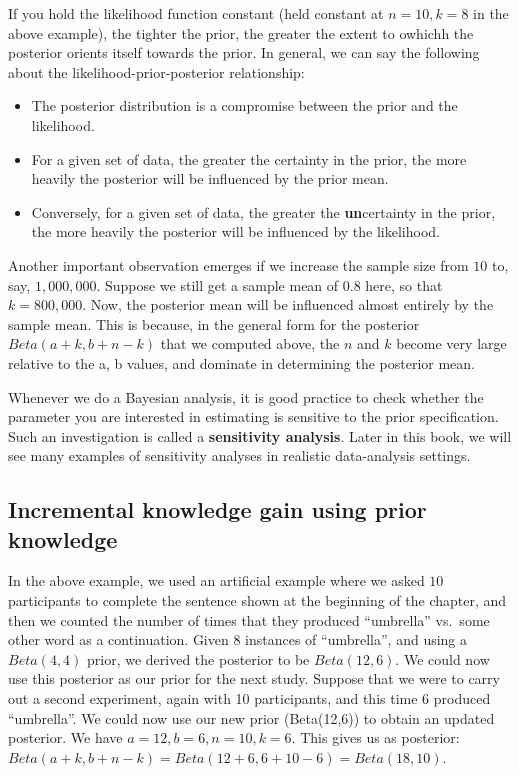 \documentclass[12pt,]{krantz}
\providecommand{\tightlist}{%
  \setlength{\itemsep}{0pt}\setlength{\parskip}{0pt}}
\theoremstyle{definition}
\theoremstyle{definition}
\theoremstyle{definition}
\theoremstyle{remark}
\begin{document}
If you hold the likelihood function constant (held constant at \(n=10, k=8\) in the above example), the tighter the prior, the greater the extent to owhichh the posterior orients itself towards the prior. In general, we can say the following about the likelihood-prior-posterior relationship:

\begin{itemize}
\tightlist
\item
  The posterior distribution is a compromise between the prior and the likelihood.
\item
  For a given set of data, the greater the certainty in the prior, the more heavily the posterior will be influenced by the prior mean.
\item
  Conversely, for a given set of data, the greater the \textbf{un}certainty in the prior, the more heavily the posterior will be influenced by the likelihood.
\end{itemize}

Another important observation emerges if we increase the sample size from \(10\) to, say, \(1,000,000\). Suppose we still get a sample mean of \(0.8\) here, so that \(k=800,000\). Now, the posterior mean will be influenced almost entirely by the sample mean. This is because, in the general form for the posterior \(Beta(a+k,b+n-k)\) that we computed above, the \(n\) and \(k\) become very large relative to the a, b values, and dominate in determining the posterior mean.

Whenever we do a Bayesian analysis, it is good practice to check whether the parameter you are interested in estimating is sensitive to the prior specification. Such an investigation is called a \textbf{sensitivity analysis}. Later in this book, we will see many examples of sensitivity analyses in realistic data-analysis settings.

\hypertarget{incremental-knowledge-gain-using-prior-knowledge}{%
\subsection{Incremental knowledge gain using prior knowledge}\label{incremental-knowledge-gain-using-prior-knowledge}}

In the above example, we used an artificial example where we asked \(10\) participants to complete the sentence shown at the beginning of the chapter, and then we counted the number of times that they produced ``umbrella'' vs.~some other word as a continuation. Given 8 instances of ``umbrella'', and using a \(Beta(4,4)\) prior, we derived the posterior to be \(Beta(12,6)\). We could now use this posterior as our prior for the next study. Suppose that we were to carry out a second experiment, again with 10 participants, and this time \(6\) produced ``umbrella''. We could now use our new prior (Beta(12,6)) to obtain an updated posterior. We have \(a=12, b=6, n=10, k=6\). This gives us as posterior:
\(Beta(a+k,b+n-k) = Beta(12+6,6+10-6)=Beta(18,10)\).
\end{document}
